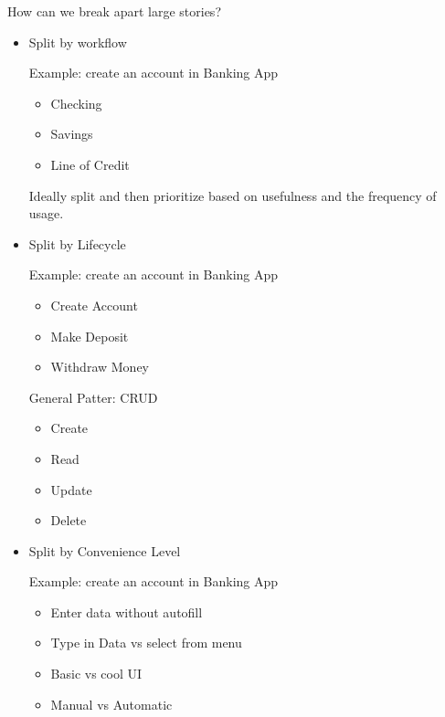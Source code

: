 \documentclass{report}
\begin{document}
\begin{description}
        How can we break apart large stories?
        \begin{itemize}
            \item Split by workflow
                \begin{mdframed}
                    Example: create an account in Banking App
                    \begin{itemize}
                        \item Checking
                        \item Savings
                        \item Line of Credit
                    \end{itemize}
                \end{mdframed}
                Ideally split and then prioritize based on
                usefulness and the frequency of usage.
            \item Split by Lifecycle
                \begin{mdframed}
                    Example: create an account in Banking App
                    \begin{itemize}
                        \item Create Account
                        \item Make Deposit
                        \item Withdraw Money
                    \end{itemize}
                \end{mdframed}

                General Patter: CRUD
                \begin{itemize}
                    \item Create
                    \item Read
                    \item Update
                    \item Delete
                \end{itemize}
            \item Split by Convenience Level
                \begin{mdframed}
                    Example: create an account in Banking App
                    \begin{itemize}
                        \item Enter data without autofill
                        \item Type in Data vs select from menu
                        \item Basic vs cool UI
                        \item Manual vs Automatic
                    \end{itemize}


\end{mdframed}
\end{itemize}
\end{description}
\end{document}
